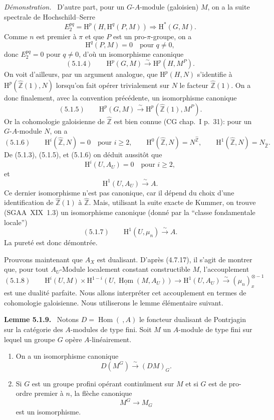 \documentclass[11pt]{article}
\newenvironment{statement}[1]{\par\medskip\noindent\textbf{#1.}\ }{\par\medskip}
\newenvironment{prooftext}[1][Proof]{\par\noindent\emph{#1.}\ }{\par\medskip}
\renewcommand{\H}{\mathrm{H}}
\DeclareMathOperator{\Hom}{Hom}
\newcommand{\Z}{\mathbb{Z}}
\providecommand{\uHom}{\underline{\Hom}}
\providecommand{\Hom}{\operatorname{Hom}}
\providecommand{\Z}{\mathbb Z}
\providecommand{\Hom}{\operatorname{Hom}}
\begin{document}
\begin{prooftext}[Démonstration]
D'autre part, pour un $G$-$A$-module (galoisien) $M$, on a la suite spectrale de Hochschild--Serre
\[
E_2^{pq}=\H^p(H,\H^q(P,M))\Longrightarrow \H^{*}(G,M).
\]
Comme $n$ est premier à $\pi$ et que $P$ est un pro-$\pi$-groupe, on a
\[
\H^q(P,M)=0\quad\text{pour }q\ne0,
\]
donc $E_2^{pq}=0$ pour $q\ne0$, d'où un isomorphisme canonique
\[
(5.1.4)\qquad \H^p(G,M)\xrightarrow{\sim}\H^p(H,M^P).
\]
On voit d'ailleurs, par un argument analogue, que $\H^p(H,N)$ s'identifie à $\H^p(\widehat{\Z}(1),N)$ lorsqu'on fait opérer trivialement sur $N$ le facteur $\widehat{\Z}(1)$. On a donc finalement, avec la convention précédente, un isomorphisme canonique
\[
(5.1.5)\qquad \H^p(G,M)\xrightarrow{\sim}\H^p(\widehat{\Z}(1),M^P).
\]
Or la cohomologie galoisienne de $\widehat{\Z}$ est bien connue (CG chap.~I p.~31): pour un $G$-$A$-module $N$, on a
\[
(5.1.6)\qquad
\H^i(\widehat{\Z},N)=0\quad\text{pour }i\geqslant2,
\qquad
\H^0(\widehat{\Z},N)=N^{\widehat{\Z}},
\qquad
\H^1(\widehat{\Z},N)=N_{\widehat{\Z}}.
\]
De (5.1.3), (5.1.5), et (5.1.6) on déduit aussitôt que
\[
\H^i(U,A_U)=0\quad\text{pour }i\geqslant2,
\]
et
\[
\H^1(U,A_U)\xrightarrow{\sim}A.
\]
Ce dernier isomorphisme n'est pas canonique, car il dépend du choix d'une identification de $\widehat{\Z}(1)$ à $\widehat{\Z}$. Mais, utilisant la suite exacte de Kummer, on trouve (SGAA~XIX~1.3) un isomorphisme canonique (donné par la ``classe fondamentale locale'')
\[
(5.1.7)\qquad \H^1(U,\mu_n)\xrightarrow{\sim}A.
\]
La pureté est donc démontrée.

Prouvons maintenant que $A_X$ est dualisant. D'après (4.7.17), il s'agit de montrer que, pour tout $A_U$-Module localement constant constructible $M$, l'accouplement
\[
(5.1.8)\qquad \H^i(U,M)\times\H^{1-i}(U,\uHom(M,A_U))\longrightarrow \H^1(U,A_U)\xrightarrow{\sim}(\mu_n)_x^{\otimes -1}
\]
est une dualité parfaite. Nous allons interpréter cet accouplement en termes de cohomologie galoisienne. Nous utiliserons le lemme élémentaire suivant.
\end{prooftext}

\begin{statement}{Lemme 5.1.9}
Notons $D=\Hom(\ ,A)$ le foncteur dualisant de Pontrjagin sur la catégorie des $A$-modules de type fini. Soit $M$ un $A$-module de type fini sur lequel un groupe $G$ opère $A$-linéairement.
\begin{enumerate}[label=(\roman*)]
\item On a un isomorphisme canonique
\[
D(M^G)\xrightarrow{\sim}(DM)_G.
\]
\item Si $G$ est un groupe profini opérant continûment sur $M$ et si $G$ est de pro-ordre premier à $n$, la flèche canonique
\[
M^G\longrightarrow M_G
\]
est un isomorphisme.
\end{enumerate}
\end{statement}
\end{document}
